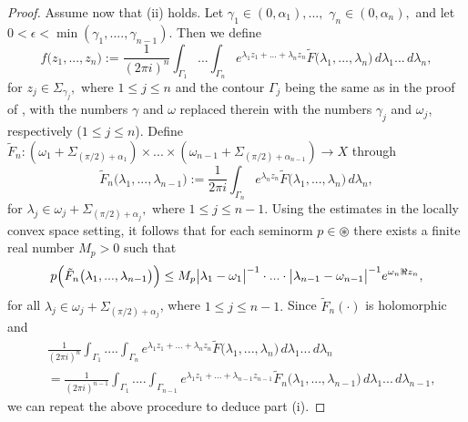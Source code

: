 \documentclass{amsart}
\theoremstyle{definition}
\theoremstyle{remark}
\numberwithin{equation}{section}
\begin{document}
\begin{proof}
Assume now that (ii) holds. Let $\gamma_{1}\in (0,\alpha_{1}), ...,$ $ \gamma_{n}\in (0,\alpha_{n}),$ and let $0<\epsilon<\min(\gamma_{1},....,\gamma_{n-1}).$ Then we define
$$
f\bigl(z_{1},...,z_{n}\bigr):=\frac{1}{(2\pi i)^{n}}\int_{\Gamma_{1}}...\int_{\Gamma_{n}}e^{\lambda_{1} z_{1}+...+\lambda_{n}z_{n}}\tilde{F}\bigl(\lambda_{1},...,\lambda_{n}\bigr)\, d\lambda_{1} ... \, d\lambda_{n},
$$
for $z_{j}\in \Sigma_{\gamma_{j}},$ where $1\leq j\leq n$ and the contour $\Gamma_{j}$ being the same as in the proof of \cite[Theorem 2.6.1]{a43}, with the numbers $\gamma$ and $\omega$ replaced therein with the numbers $\gamma_{j}$ and $\omega_{j}$, respectively ($1\leq j\leq n$). Define
$
\tilde{F}_{n} : (\omega_{1}+\Sigma_{(\pi/2)+\alpha_{1}}) \times ... \times (\omega_{n-1}+\Sigma_{(\pi/2)+\alpha_{n-1}})\rightarrow X
$ through
$$
\tilde{F}_{n}\bigl(\lambda_{1},...,\lambda_{n-1}\bigr)  :=\frac{1}{2\pi i }\int_{\Gamma_{n}}e^{\lambda_{n} z_{n}}\tilde{F}\bigl(\lambda_{1},...,\lambda_{n}\bigr)\,d\lambda_{n},
$$
for $\lambda_{j}\in \omega_{j}+\Sigma_{(\pi/2)+\alpha_{j}},$ where $1\leq j\leq n-1.$
Using the estimates \cite[(2.12)-(2.15)]{a43} in the locally convex space setting, it follows that for each seminorm $p\in \circledast$ there exists a finite real number $M_{p}>0$ such that
\begin{align*}
p\Bigl( \tilde{F}_{n}\bigl(\lambda_{1},...,\lambda_{n-1}\bigr)\Bigr)
\leq M_{p}\bigl| \lambda_{1}-\omega_{1} \bigr|^{-1}\cdot ... \cdot \bigl| \lambda_{n-1}-\omega_{n-1} \bigr|^{-1}e^{\omega_{n}\Re z_{n}},
\end{align*}
for all $\lambda_{j}\in \omega_{j}+\Sigma_{(\pi/2)+\alpha_{j}}$, where $1\leq j\leq n-1.$
Since $\tilde{F}_{n}(\cdot)$ is holomorphic and
\begin{align*}
&\frac{1}{(2\pi i)^{n}}\int_{\Gamma_{1}}....\int_{\Gamma_{n}}e^{\lambda_{1} z_{1}+...+\lambda_{n}z_{n}}\tilde{F}\bigl(\lambda_{1},...,\lambda_{n}\bigr)\, d\lambda_{1} ... \, d\lambda_{n}
\\&= \frac{1}{(2\pi i)^{n-1}}\int_{\Gamma_{1}}....\int_{\Gamma_{n-1}}e^{\lambda_{1} z_{1}+...+\lambda_{n-1}z_{n-1}}\tilde{F}_{n}\bigl(\lambda_{1},...,\lambda_{n-1}\bigr)\, d\lambda_{1} ... \, d\lambda_{n-1},
\end{align*}
we can repeat the above procedure to deduce part (i).


\end{proof}
\end{document}
